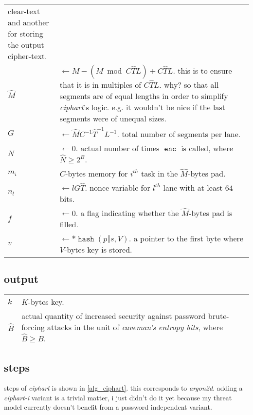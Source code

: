\documentclass[twocolumn]{article}
\DeclareMathOperator{\enc}{\mathtt{enc}}
\DeclareMathOperator{\hash}{\mathtt{hash}}
\begin{document}
\begin{tabularx}{\columnwidth}{lX}
                    clear-text and another for storing the output
                    cipher-text.\\
    $\hat M$    & $\gets M - (M \bmod C\hat TL) + C\hat TL$.  this is to
                    ensure that it is in multiples of $C\hat TL$.  why?  so
                    that all segments are of equal lengths in order to
                    simplify \emph{ciphart}'s logic.  e.g. it wouldn't be
                    nice if the last segments were of unequal sizes.\\
    $G$         & $\gets \hat MC^{-1}\hat T^{-1}L^{-1}$.  total number of
                    segments per lane.\\
    $N$    & $\gets 0$.  actual number of times $\enc$ is called,
                    where $\hat N \ge 2^B$.\\
    $m_i$       & $C$-bytes memory for $i^{th}$ task in the $\hat M$-bytes
                    pad.\\
    $n_l$       & $\gets lG\hat T$.  nonce variable for $l^{th}$ lane with
                    at least $64$ bits.\\
    $f$         & $\gets 0$.  a flag indicating whether the $\hat M$-bytes
                    pad is filled.\\
    $v$         & $\gets *\hash(p \mathbin\Vert s, V)$.  a pointer to the
                    first byte where $V$-bytes key is stored.\\
\end{tabularx}

\subsection{output}
\begin{tabularx}{\columnwidth}{lX}
$k$ & $K$-bytes key.\\
$\hat B$ & actual quantity of increased security against password
            brute-forcing attacks in the unit of \emph{caveman's entropy
            bits}, where $\hat B \ge B$.\\
\end{tabularx}

\subsection{steps}
steps of \emph{ciphart} is shown in \cref{alg_ciphart}.  this corresponds
to \emph{argon2d}.  adding a \emph{ciphart-i} variant is a trivial matter,
i just didn't do it yet because my threat model currently doesn't benefit
from a password independent variant.
\end{document}
